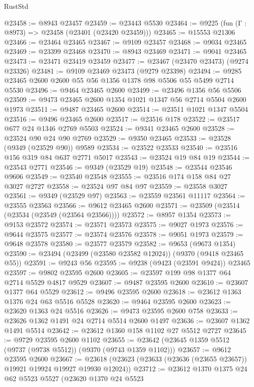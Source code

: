 \begin{lexlean}{RustStd}
\begin{coremodule}
{\begin{coremodule}
{{{{{{{{{{{{{{{{{{{{{{{{{{{{{{{{{{{{{{{@23458 := @8943 @23457
@23459 := @23443 @5530
@23464 := @9225 (fun (Γ : @8973) => @23458 (@23401 (@23420 @23459)))
@23465 := @15553 @21306
@23466 := @23464 @23465
@23467 := @9109 @23457
@23468 := @9034 @23465
@23469 := @23399 @23468
@23470 := @8943 @23469
@23471 := @9041 @23465
@23473 := @23471 @23419 @23459
@23477 := @23467 (@23470 @23473) (@9274 @23326)
@23481 := @9109 @23469 @23473 (@9279 @23398)
@23494 := @9285 @23465 @2600 @2600 @55 @56 @1356 @1378 @98 @5506 @55 @5499 @2714 @5530
@23496 := @9464 @23465 @2600
@23499 := @23496 @1356 @56 @5506
@23509 := @9473 @23465 @2600 @1354 @1021 @1347 @56 @2714 @5504 @2600 @1973
@23511 := @9487 @23465 @2600
@23514 := @23511 @1021 @1347 @5504
@23516 := @9496 @23465 @2600
@23517 := @23516 @178
@23522 := @23517 @677 @24 @1346 @2769 @5503
@23524 := @9341 @23465 @2600
@23528 := @23524 @90 @24 @90 @2769
@23529 := @9350 @23465
@23533 := @23528 (@9349 (@23529 @90)) @9589
@23534 := @23522 @23533
@23540 := @23516 @156 @319 @84 @637 @2771 @5017
@23543 := @23524 @19 @84 @19
@23544 := @23543 @2771
@23546 := @9349 (@23529 @19)
@23548 := @23544 @23546 @9606
@23549 := @23540 @23548
@23555 := @23516 @174 @158 @84 @27 @3027 @2727
@23558 := @23524 @97 @84 @97
@23559 := @23558 @3027
@23561 := @9349 (@23529 @97)
@23563 := @23559 @23561 @11117
@23564 := @23555 @23563
@23566 := @9612 @23465 @2600
@23571 := @23509 (@23514 (@23534 (@23549 (@23564 @23566))))
@23572 := @8957 @1354
@23573 := @9153 @23572
@23574 := @23571 @23573
@23575 := @9027 @1973
@23576 := @9644 @23575
@23577 := @23574 @23576
@23578 := @9051 @1973
@23579 := @9648 @23578
@23580 := @23577 @23579
@23582 := @9653 (@9673 @1354)
@23590 := @23494 (@23499 (@23580 @23582 @12024)) (@9370 (@9418 @23465 @55))
@23591 := @9243 @56
@23595 := @9238 (@9423 (@23591 @9424)) @23465
@23597 := @9802 @23595 @2600
@23605 := @23597 @199 @98 @1377 @64 @2714 @5529 @4817 @9529
@23607 := @9487 @23595 @2600
@23610 := @23607 @1377 @64 @5529
@23612 := @9496 @23595 @2600
@23618 := @23612 @1363 @1376 @24 @63 @5516 @5528
@23620 := @9464 @23595 @2600
@23623 := @23620 @1363 @24 @5516
@23626 := @9473 @23595 @2600 @758
@23633 := @23626 @1362 @1491 @24 @2714 @5514 @2600 @1497
@23636 := @23607 @1362 @1491 @5514
@23642 := @23612 @1360 @158 @1102 @27 @5512 @2727
@23645 := @9729 @23595 @2600 @1102
@23655 := @23642 (@23645 @1359 @5512 (@9737 (@9738 @5512)) (@9370 (@9743 @1359 @1102)))
@23657 := @9612 @23595 @2600
@23667 := @23618 (@23623 (@23633 (@23636 (@23655 @23657)) @19921 @19924 @19927 @19930 @12024))
@23712 := @23612
    @1370
    @1375
    @24
    @62
    @5523
    @5527
    (@23620
      @1370
      @24
      @5523
}}}}}}}}}}}}}}}}}}}}}}}}}}}}}}}}}}}}}}}
\end{coremodule}}
\end{coremodule}
\end{lexlean}
